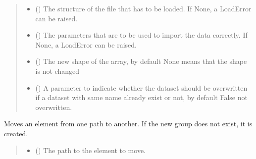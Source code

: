 \documentclass[letterpaper,10pt,english]{sphinxmanual}
\begin{document}
\begin{fulllineitems}
\begin{fulllineitems}
\begin{quote}
\begin{description}
\begin{itemize}
\item {} 
\sphinxAtStartPar
{} (\sphinxstyleliteralemphasis{\sphinxupquote{, }}) \textendash{} The structure of the file that has to be loaded. If None, a LoadError can be raised.

\item {} 
\sphinxAtStartPar
{} (\sphinxstyleliteralemphasis{\sphinxupquote{, }}) \textendash{} The parameters that are to be used to import the data correctly.  If None, a LoadError can be raised.

\item {} 
\sphinxAtStartPar
{} (\sphinxstyleliteralemphasis{\sphinxupquote{, }}) \textendash{} The new shape of the array, by default None means that the shape is not changed

\item {} 
\sphinxAtStartPar
{} (\sphinxstyleliteralemphasis{\sphinxupquote{, }}) \textendash{} A parameter to indicate whether the dataset should be overwritten if a dataset with same name already exist or not, by default False \sphinxhyphen{} not overwritten.

\end{itemize}

\end{description}\end{quote}

\end{fulllineitems}


\begin{fulllineitems}
\label{\detokenize{source/HDF5_BLS:HDF5_BLS.wrapper.Wrapper.move}}
\pysigstartsignatures
\pysiglinewithargsret
{}
{\sphinxparamcomma {}}
{}
\pysigstopsignatures
\sphinxAtStartPar
Moves an element from one path to another. If the new group does not exist, it is created.
\begin{quote}\begin{description}
\begin{itemize}
\item {} 
\sphinxAtStartPar
{} () \textendash{} The path to the element to move.


\end{itemize}
\end{description}
\end{quote}
\end{fulllineitems}
\end{fulllineitems}
\end{document}
